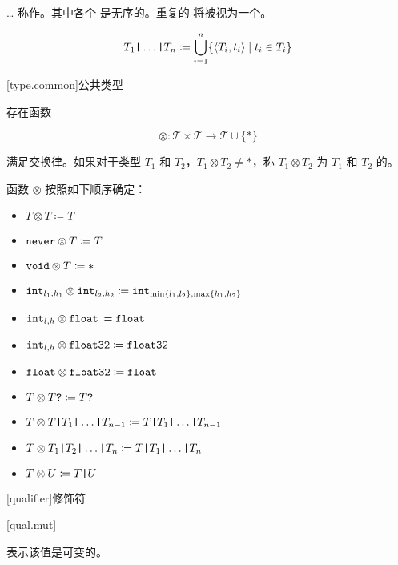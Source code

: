 \pnum
{}\ldots{} 称作。其中各个  是无序的。重复的  将被视为一个。

$$ T_1 \texttt{|} \ldots \texttt{|} T_n \coloneqq \bigcup^n_{i=1} \{ \langle T_i, t_i \rangle \mid t_i \in T_i \} $$

[type.common]{公共类型}

\pnum
存在函数

$$ \otimes: \mathcal{T} \times \mathcal{T} \rightarrow \mathcal{T} \cup \{ \ast \} $$

满足交换律。如果对于类型 $T_1$ 和 $T_2$，$T_1 \otimes T_2 \ne \ast$，称 $T_1 \otimes T_2$ 为 $T_1$ 和 $T_2$ 的。

\pnum
函数 $\otimes$ 按照如下顺序确定：

\begin{itemize}
\item $T \otimes T \coloneqq T$
\item $\texttt{never} \otimes T \coloneqq T$
\item $\texttt{void} \otimes T \coloneqq \ast$
\item $\texttt{int}_{l_1,h_1} \otimes \texttt{int}_{l_2,h_2} \coloneqq \texttt{int}_{\min\{l_1, l_2\},\max\{h_1, h_2\}}$
\item $\texttt{int}_{l,h} \otimes \texttt{float} \coloneqq \texttt{float}$
\item $\texttt{int}_{l,h} \otimes \texttt{float32} \coloneqq \texttt{float32}$
\item $\texttt{float} \otimes \texttt{float32} \coloneqq \texttt{float}$
\item $T \otimes T\texttt{?} \coloneqq T\texttt{?}$
\item $T \otimes T \texttt{|} T_1 \texttt{|} \ldots \texttt{|} T_{n-1} \coloneqq T \texttt{|} T_1 \texttt{|} \ldots \texttt{|} T_{n-1}$
\item $T \otimes T_1 \texttt{|} T_2 \texttt{|} \ldots \texttt{|} T_n \coloneqq T \texttt{|} T_1 \texttt{|} \ldots \texttt{|} T_n$
\item $T \otimes U \coloneqq T \texttt{|} U$
\end{itemize}

[qualifier]{修饰符}

[qual.mut]{}

\pnum
{} 表示该值是可变的。
